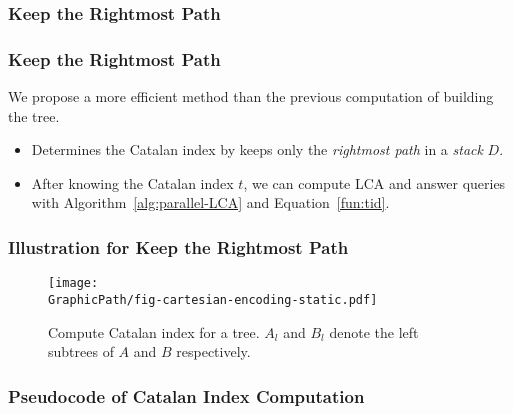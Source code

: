 \subsubsection{Keep the Rightmost Path}
\begin{frame}
	\frametitle{Keep the Rightmost Path}
	We propose a more efficient method than the previous computation of
	building the tree.

	\begin{itemize}
		\setlength\itemsep{1em}
		\item 
			Determines the Catalan index by keeps only the {\em
			rightmost path} in a {\em stack} $D$.
		\item
			After knowing the Catalan index $t$, we can compute LCA and
			answer queries with Algorithm~\ref{alg:parallel-LCA} and
			Equation~\ref{fun:tid}.
	\end{itemize}
\end{frame}

\begin{withoutheadline}
\begin{frame}
	\frametitle{Illustration for Keep the Rightmost Path}
	\begin{center}
		\scalebox{1} { \begin{minipage}{\textwidth}
			\begin{figure}[!thb]
			  \centering
			  \texttt{[image: \\GraphicPath/fig-cartesian-encoding-static.pdf]}
			  \caption{Compute Catalan index for a tree.  $A_l$ and $B_l$ denote
			    the left subtrees of $A$ and $B$ respectively.}
			  \label{fig:fig-cartesian-encoding-static}
			\end{figure}
			\end{minipage}
		}
	\end{center}
\end{frame}
\end{withoutheadline}

\begin{withoutheadline}
\begin{frame}
	\frametitle{Pseudocode of Catalan Index Computation}
	\begin{center}
		\scalebox{0.7} { \begin{minipage}{\textwidth}
			
			\end{minipage}
		}
	\end{center}
\end{frame}
\end{withoutheadline}

